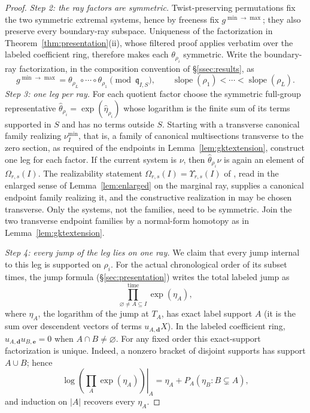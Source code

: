 \documentclass[11pt]{amsart}
\theoremstyle{definition}
\theoremstyle{remark}
\newcommand{\Om}{\Omega_{r,s}}
\begin{document}
\begin{proof}
\emph{Step 2: the ray factors are symmetric.}
Twist-preserving permutations fix the two symmetric extremal systems, hence by
freeness fix $g^{\min\to\max}$; they also preserve every boundary-ray
subspace. Uniqueness of the factorization in
Theorem~\ref{thm:presentation}(ii), whose filtered proof applies verbatim
over the labeled coefficient ring, therefore makes each
$\theta_{\rho_i}$ symmetric.
Write the boundary-ray factorization, in the composition convention of
\S\ref{ssec:results}, as
\[
g^{\min\to\max}
=\theta_{\rho_L}\circ\cdots\circ\theta_{\rho_1}
\pmod{\mathfrak q_{I,S}},
\qquad \operatorname{slope}(\rho_1)<\cdots<
\operatorname{slope}(\rho_L).
\]
\emph{Step 3: one leg per ray.}
For each quotient factor choose the symmetric full-group representative
$\widehat\theta_{\rho_i}=\exp(\widehat\eta_{\rho_i})$ whose logarithm is the
finite sum of its terms supported in $S$ and has no terms outside $S$.
Starting with a transverse canonical family realizing $\nu_I^{\min}$, that
is, a family of canonical multisections \cite[Def.~3.22]{GKT} transverse to
the zero section, as required of the endpoints in Lemma~\ref{lem:gktextension},
construct one leg for each factor. If the current system is $\nu$, then
$\widehat\theta_{\rho_i}\nu$ is again an element of $\Om(I)$. The
realizability statement $\Om(I)=\Upsilon_{r,s}(I)$ of \cite[Cor.~5.14]{GKT},
read in the enlarged sense of Lemma~\ref{lem:enlarged} on the marginal ray,
supplies a canonical endpoint family realizing it, and the constructive
realization in \cite[Thm.~5.13, Lem.~5.15]{GKT} may be chosen transverse.
Only the systems, not the families, need to be symmetric. Join the two
transverse endpoint families by a normal-form homotopy as in
Lemma~\ref{lem:gktextension}.

\emph{Step 4: every jump of the leg lies on one ray.}
We claim that every jump internal to this leg is supported on $\rho_i$.
For the actual chronological order of its subset times, the jump formula
(\S\ref{sec:presentation}) writes the total labeled jump as
\[
\prod_{\varnothing\ne A\subseteq I}^{\mathrm{time}}\exp(\eta_A),
\]
where $\eta_A$, the logarithm of the jump at $T_A$, has exact label support
$A$ (it is the sum over descendent vectors of terms $u_{A,\mathbf d}X$). In the labeled coefficient ring,
$u_{A,\mathbf d}u_{B,\mathbf e}=0$ when $A\cap B\ne\varnothing$.
For any fixed order this exact-support factorization is unique. Indeed,
a nonzero bracket of disjoint supports has support $A\cup B$; hence
\[
\left.\log\!\left(\prod_A\exp(\eta_A)\right)\right|_A
=\eta_A+P_A(\eta_B:B\subsetneq A),
\]
and induction on $\lvert A\rvert$ recovers every $\eta_A$.


\end{proof}
\end{document}
